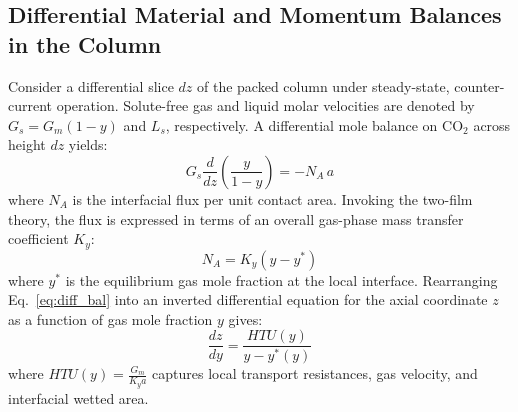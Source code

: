 \documentclass[11pt,a4paper]{article}
\begin{document}
\subsection{Differential Material and Momentum Balances in the Column}
Consider a differential slice $dz$ of the packed column under steady-state, counter-current operation. Solute-free gas and liquid molar velocities are denoted by $G_s = G_m(1-y)$ and $L_s$, respectively. A differential mole balance on $\text{CO}_2$ across height $dz$ yields:
\begin{equation}
G_s \frac{d}{dz}\left( \frac{y}{1-y} \right) = -N_A \, a
\label{eq:diff_bal}
\end{equation}
where $N_A$ is the interfacial flux per unit contact area. Invoking the two-film theory, the flux is expressed in terms of an overall gas-phase mass transfer coefficient $K_y$:
\begin{equation}
N_A = K_y (y - y^*)
\end{equation}
where $y^*$ is the equilibrium gas mole fraction at the local interface. Rearranging Eq.~\eqref{eq:diff_bal} into an inverted differential equation for the axial coordinate $z$ as a function of gas mole fraction $y$ gives:
\begin{equation}
\frac{dz}{dy} = \frac{HTU(y)}{y - y^*(y)}
\label{eq:dz_dy}
\end{equation}
where $HTU(y) = \frac{G_m}{K_y a}$ captures local transport resistances, gas velocity, and interfacial wetted area.
\end{document}
